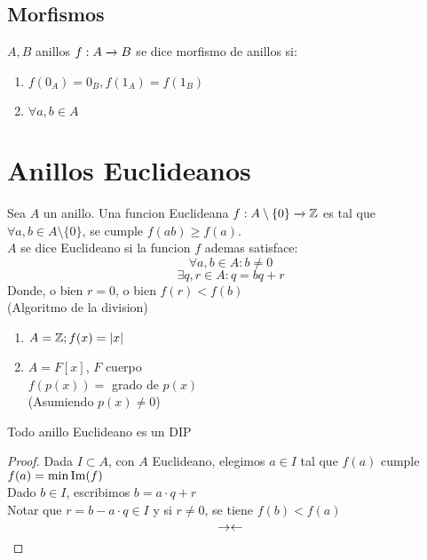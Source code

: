     \section{Morfismos}
    $A,B$ anillos $f:A\xrightarrow[]{}B$ se dice morfismo de anillos si:
    \begin{enumerate}
        \item $f(0_A)=0_B, f(1_A)=f(1_B)$

        \item $\forall a,b\in A$
    \end{enumerate}


    \chapter{Anillos Euclideanos}
    Sea $A$ un anillo. Una funcion Euclideana $f:A\setminus\{0\}\xrightarrow[]{}\mathbb{Z}$ es tal que $\forall a,b\in A\setminus\{0\}$, se cumple $f(ab)\geq f(a)$.\\
    $A$ se dice Euclideano si la funcion $f$ ademas satisface:
    \[\forall a,b \in A:b\neq 0\]
    \[\exists q,r\in A:q=bq+r\]
    Donde, o bien $r=0$, o bien $f(r)<f(b)$\\
    (Algoritmo de la division)
    \begin{ejm}
        \hfill
        \begin{enumerate}
            \item $A=\mathbb{Z}; f(x)=|x|$

            \item $A=F[x]$, $F$ cuerpo\\
            $f(p(x))=$ grado de $p(x)$\\
            (Asumiendo $p(x)\neq 0$)
        \end{enumerate}
    \end{ejm}

    \begin{obs}
        Todo anillo Euclideano es un DIP
        \begin{proof}
            Dada $I\subset A$, con $A$ Euclideano, elegimos $a\in I$ tal que $f(a)$ cumple $f(a)=\min\operatorname{Im}(f)$\\
            Dado $b\in I$, escribimos $b=a\cdot q+r$\\
            Notar que $r=b-a\cdot q\in I$ y si $r\neq 0$, se tiene $f(b)<f(a)$
            \[\rightarrow\leftarrow\]
        \end{proof}
    \end{obs}

